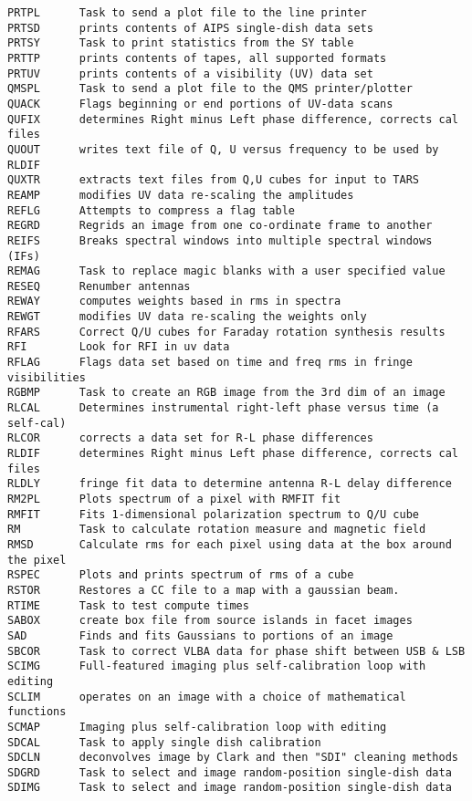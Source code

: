 \begin{verbatim}
PRTPL      Task to send a plot file to the line printer
PRTSD      prints contents of AIPS single-dish data sets
PRTSY      Task to print statistics from the SY table
PRTTP      prints contents of tapes, all supported formats
PRTUV      prints contents of a visibility (UV) data set
QMSPL      Task to send a plot file to the QMS printer/plotter
QUACK      Flags beginning or end portions of UV-data scans
QUFIX      determines Right minus Left phase difference, corrects cal files
QUOUT      writes text file of Q, U versus frequency to be used by RLDIF
QUXTR      extracts text files from Q,U cubes for input to TARS
REAMP      modifies UV data re-scaling the amplitudes
REFLG      Attempts to compress a flag table
REGRD      Regrids an image from one co-ordinate frame to another
REIFS      Breaks spectral windows into multiple spectral windows (IFs)
REMAG      Task to replace magic blanks with a user specified value
RESEQ      Renumber antennas
REWAY      computes weights based in rms in spectra
REWGT      modifies UV data re-scaling the weights only
RFARS      Correct Q/U cubes for Faraday rotation synthesis results
RFI        Look for RFI in uv data
RFLAG      Flags data set based on time and freq rms in fringe visibilities
RGBMP      Task to create an RGB image from the 3rd dim of an image
RLCAL      Determines instrumental right-left phase versus time (a self-cal)
RLCOR      corrects a data set for R-L phase differences
RLDIF      determines Right minus Left phase difference, corrects cal files
RLDLY      fringe fit data to determine antenna R-L delay difference
RM2PL      Plots spectrum of a pixel with RMFIT fit
RMFIT      Fits 1-dimensional polarization spectrum to Q/U cube
RM         Task to calculate rotation measure and magnetic field
RMSD       Calculate rms for each pixel using data at the box around the pixel
RSPEC      Plots and prints spectrum of rms of a cube
RSTOR      Restores a CC file to a map with a gaussian beam.
RTIME      Task to test compute times
SABOX      create box file from source islands in facet images
SAD        Finds and fits Gaussians to portions of an image
SBCOR      Task to correct VLBA data for phase shift between USB & LSB
SCIMG      Full-featured imaging plus self-calibration loop with editing
SCLIM      operates on an image with a choice of mathematical functions
SCMAP      Imaging plus self-calibration loop with editing
SDCAL      Task to apply single dish calibration
SDCLN      deconvolves image by Clark and then "SDI" cleaning methods
SDGRD      Task to select and image random-position single-dish data
SDIMG      Task to select and image random-position single-dish data

\end{verbatim}
